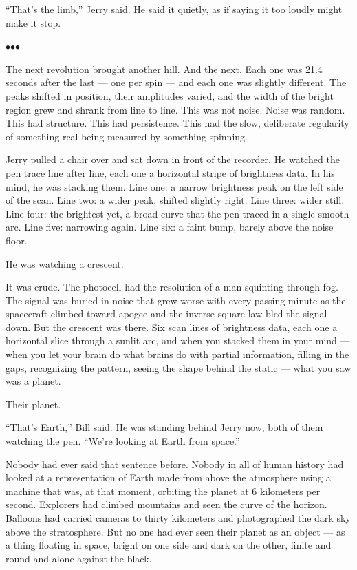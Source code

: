 \documentclass[12pt, letterpaper]{article}
\begin{document}
``That's the limb,'' Jerry said. He said it quietly, as if saying it too loudly might make it stop.

\bigskip
\centerline{$\bullet$\quad$\bullet$\quad$\bullet$}
\bigskip

The next revolution brought another hill. And the next. Each one was 21.4 seconds after the last --- one per spin --- and each one was slightly different. The peaks shifted in position, their amplitudes varied, and the width of the bright region grew and shrank from line to line. This was not noise. Noise was random. This had structure. This had persistence. This had the slow, deliberate regularity of something real being measured by something spinning.

Jerry pulled a chair over and sat down in front of the recorder. He watched the pen trace line after line, each one a horizontal stripe of brightness data. In his mind, he was stacking them. Line one: a narrow brightness peak on the left side of the scan. Line two: a wider peak, shifted slightly right. Line three: wider still. Line four: the brightest yet, a broad curve that the pen traced in a single smooth arc. Line five: narrowing again. Line six: a faint bump, barely above the noise floor.

He was watching a crescent.

It was crude. The photocell had the resolution of a man squinting through fog. The signal was buried in noise that grew worse with every passing minute as the spacecraft climbed toward apogee and the inverse-square law bled the signal down. But the crescent was there. Six scan lines of brightness data, each one a horizontal slice through a sunlit arc, and when you stacked them in your mind --- when you let your brain do what brains do with partial information, filling in the gaps, recognizing the pattern, seeing the shape behind the static --- what you saw was a planet.

Their planet.

``That's Earth,'' Bill said. He was standing behind Jerry now, both of them watching the pen. ``We're looking at Earth from space.''

Nobody had ever said that sentence before. Nobody in all of human history had looked at a representation of Earth made from above the atmosphere using a machine that was, at that moment, orbiting the planet at 6 kilometers per second. Explorers had climbed mountains and seen the curve of the horizon. Balloons had carried cameras to thirty kilometers and photographed the dark sky above the stratosphere. But no one had ever seen their planet as an object --- as a thing floating in space, bright on one side and dark on the other, finite and round and alone against the black.
\end{document}
